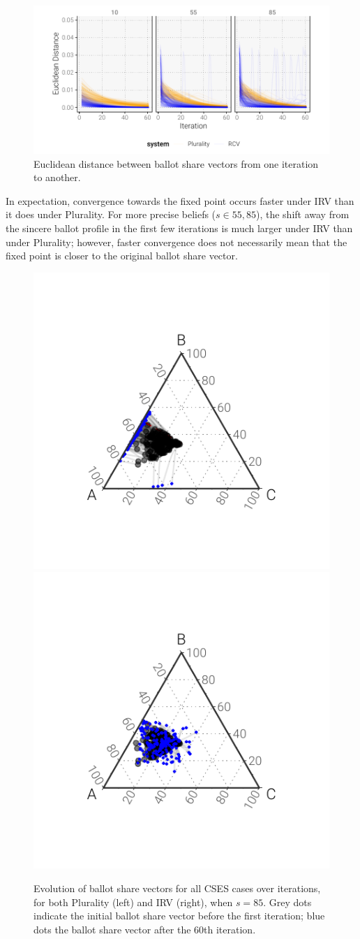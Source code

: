 \documentclass[12pt, letter]{article}
\begin{document}
\begin{figure}[!tbh]
	\centering
	\includegraphics[width = \textwidth]{../output/figures/euclidean}
	\caption{Euclidean distance between ballot share vectors from one iteration to another.}
	\label{fig:convergence}
\end{figure}

 In expectation, convergence towards the fixed point occurs faster under IRV than it does under Plurality. For more precise beliefs ($s \in {55, 85}$), the shift away from the sincere ballot profile in the first few iterations is much larger under IRV than under Plurality; however, faster convergence does not necessarily mean that the fixed point is closer to the original ballot share vector.

 \begin{figure}[]
	\centering
	\includegraphics[width = .49\textwidth]{../output/figures/tatonnement_plur}
	\includegraphics[width = .49\textwidth]{../output/figures/tatonnement_rcv}
	\caption{Evolution of ballot share vectors for all CSES cases over iterations, for both Plurality (left) and IRV (right), when $s = 85$. Grey dots indicate the initial ballot share vector before the first iteration; blue dots the ballot share vector after the 60th iteration.}
	\label{fig:convergence_paths}
\end{figure}
\end{document}
